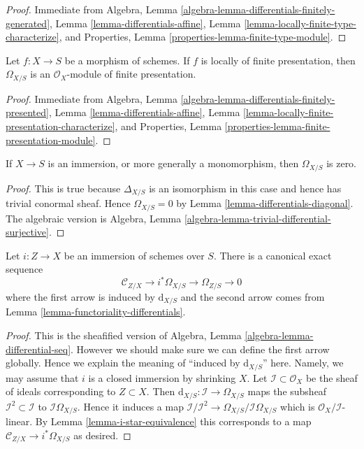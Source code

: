 \begin{proof}
Immediate from
Algebra, Lemma \ref{algebra-lemma-differentials-finitely-generated},
Lemma \ref{lemma-differentials-affine},
Lemma \ref{lemma-locally-finite-type-characterize}, and
Properties, Lemma \ref{properties-lemma-finite-type-module}.
\end{proof}

\begin{lemma}
\label{lemma-finite-presentation-differentials}
Let $f : X \to S$ be a morphism of schemes.
If $f$ is locally of finite presentation, then $\Omega_{X/S}$ is
an $\mathcal{O}_X$-module of finite presentation.
\end{lemma}

\begin{proof}
Immediate from
Algebra, Lemma \ref{algebra-lemma-differentials-finitely-presented},
Lemma \ref{lemma-differentials-affine},
Lemma \ref{lemma-locally-finite-presentation-characterize}, and
Properties, Lemma \ref{properties-lemma-finite-presentation-module}.
\end{proof}

\begin{lemma}
\label{lemma-immersion-differentials}
If $X \to S$ is an immersion, or more generally a monomorphism, then
$\Omega_{X/S}$ is zero.
\end{lemma}

\begin{proof}
This is true because $\Delta_{X/S}$ is an isomorphism in this case
and hence has trivial conormal sheaf. Hence $\Omega_{X/S} = 0$
by Lemma \ref{lemma-differentials-diagonal}. The algebraic version is
Algebra, Lemma \ref{algebra-lemma-trivial-differential-surjective}.
\end{proof}

\begin{lemma}
\label{lemma-differentials-relative-immersion}
Let $i : Z \to X$ be an immersion of schemes over $S$.
There is a canonical exact sequence
$$
\mathcal{C}_{Z/X} \to i^*\Omega_{X/S} \to \Omega_{Z/S} \to 0
$$
where the first arrow is induced by $\text{d}_{X/S}$
and the second arrow comes from Lemma \ref{lemma-functoriality-differentials}.
\end{lemma}

\begin{proof}
This is the sheafified version of
Algebra, Lemma \ref{algebra-lemma-differential-seq}. However
we should make sure we can define the first arrow globally.
Hence we explain the meaning of ``induced by $\text{d}_{X/S}$'' here.
Namely, we may assume that $i$ is a closed immersion by
shrinking $X$. Let $\mathcal{I} \subset \mathcal{O}_X$
be the sheaf of ideals corresponding to $Z \subset X$.
Then $\text{d}_{X/S} : \mathcal{I} \to \Omega_{X/S}$
maps the subsheaf $\mathcal{I}^2 \subset \mathcal{I}$ to
$\mathcal{I}\Omega_{X/S}$. Hence it induces a map
$\mathcal{I}/\mathcal{I}^2 \to \Omega_{X/S}/\mathcal{I}\Omega_{X/S}$
which is $\mathcal{O}_X/\mathcal{I}$-linear.
By Lemma \ref{lemma-i-star-equivalence} this corresponds to a map
$\mathcal{C}_{Z/X} \to i^*\Omega_{X/S}$ as desired.
\end{proof}

